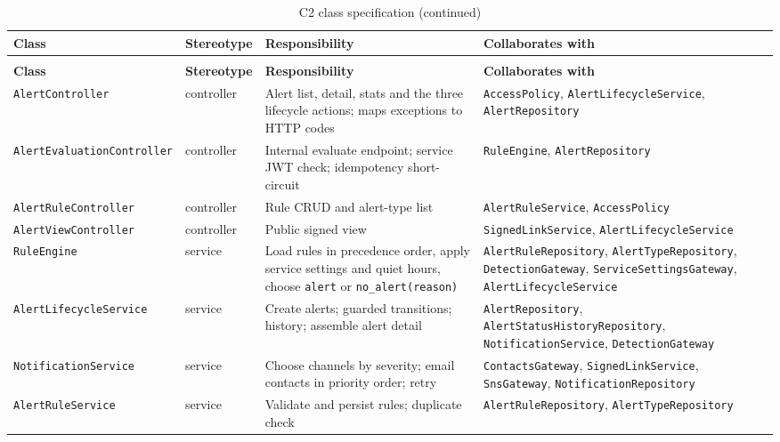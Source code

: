 \begin{longtable}{L{3.6cm}L{1.9cm}L{5.6cm}L{3.7cm}}
\caption{C2 class specification}\label{tab:c2-classspec}\\
\toprule
\textbf{Class} & \textbf{Stereotype} & \textbf{Responsibility} & \textbf{Collaborates with} \\
\midrule
\endfirsthead
\caption[]{C2 class specification (continued)}\\
\toprule
\textbf{Class} & \textbf{Stereotype} & \textbf{Responsibility} & \textbf{Collaborates with} \\
\midrule
\endhead
\texttt{AlertController} & controller & Alert list, detail, stats and the three lifecycle actions; maps exceptions to HTTP codes & \texttt{AccessPolicy}, \texttt{AlertLifecycle\allowbreak Service}, \texttt{AlertRepository} \\
\texttt{AlertEvaluation\allowbreak Controller} & controller & Internal evaluate endpoint; service JWT check; idempotency short-circuit & \texttt{RuleEngine}, \texttt{AlertRepository} \\
\texttt{AlertRuleController} & controller & Rule CRUD and alert-type list & \texttt{AlertRuleService}, \texttt{AccessPolicy} \\
\texttt{AlertViewController} & controller & Public signed view & \texttt{SignedLinkService}, \texttt{AlertLifecycle\allowbreak Service} \\
\texttt{RuleEngine} & service & Load rules in precedence order, apply service settings and quiet hours, choose \texttt{alert} or \texttt{no\_alert(reason)} & \texttt{AlertRuleRepository}, \texttt{AlertTypeRepository}, \texttt{DetectionGateway}, \texttt{ServiceSettings\allowbreak Gateway}, \texttt{AlertLifecycle\allowbreak Service} \\
\texttt{AlertLifecycle\allowbreak Service} & service & Create alerts; guarded transitions; history; assemble alert detail & \texttt{AlertRepository}, \texttt{AlertStatusHistory\allowbreak Repository}, \texttt{Notification\allowbreak Service}, \texttt{DetectionGateway} \\
\texttt{Notification\allowbreak Service} & service & Choose channels by severity; email contacts in priority order; retry & \texttt{ContactsGateway}, \texttt{SignedLinkService}, \texttt{SnsGateway}, \texttt{Notification\allowbreak Repository} \\
\texttt{AlertRuleService} & service & Validate and persist rules; duplicate check & \texttt{AlertRuleRepository}, \texttt{AlertTypeRepository} \\

\end{longtable}
